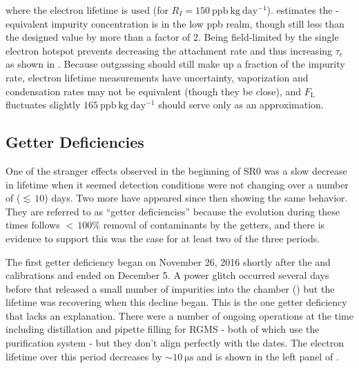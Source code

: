 \noindent where the \alphadecay electron lifetime is used (for
\metakr $R_I = 150\ \mathrm{ppb\ kg\ day^{-1}}$).   estimates the -equivalent
impurity concentration is in the low ppb realm, though still less than the designed value by more than a factor of 2.  Being field-limited
by the single electron hotspot prevents decreasing the attachment rate and thus increasing $\tau_e$ as shown in
.  Because outgassing should still make up a fraction
of the impurity rate, electron lifetime measurements
have uncertainty, vaporization and condensation rates may not be equivalent (though they be close), and $F_{\mathrm{L}}$ fluctuates
slightly $165\ \mathrm{ppb\ kg\ day^{-1}}$ should serve only as an approximation.



\subsection{Getter Deficiencies}
\label{subsec:electron_lifetime_model_detector_effects_getter}
One of the stranger effects observed in the beginning of SR0 was a slow decrease in lifetime when it seemed detection conditions were not
changing over a number of (${\lesssim}\, 10$) days.  Two more have appeared since then showing the same behavior.  They are referred to
as ``getter deficiencies'' because the evolution during these times follows ${<}\, 100\%$ removal of
contaminants by the getters, and there is evidence to support this was the case for at least two of the three periods.

The first getter deficiency
began on November 26, 2016 shortly after the \ambe and \metakr calibrations and ended on December 5.  A power glitch occurred several
days before that released a small number of impurities into the chamber
() but the lifetime was recovering when this decline
began.  This is the one getter deficiency that lacks an explanation.  There were a number of ongoing operations
at the time including  distillation and pipette filling for RGMS - both of which use the purification system - but they don't
align perfectly with the dates.  The electron lifetime over this period decreases by ${\sim}10\ \mathrm{\mu s}$ and is shown in the left
panel of .

